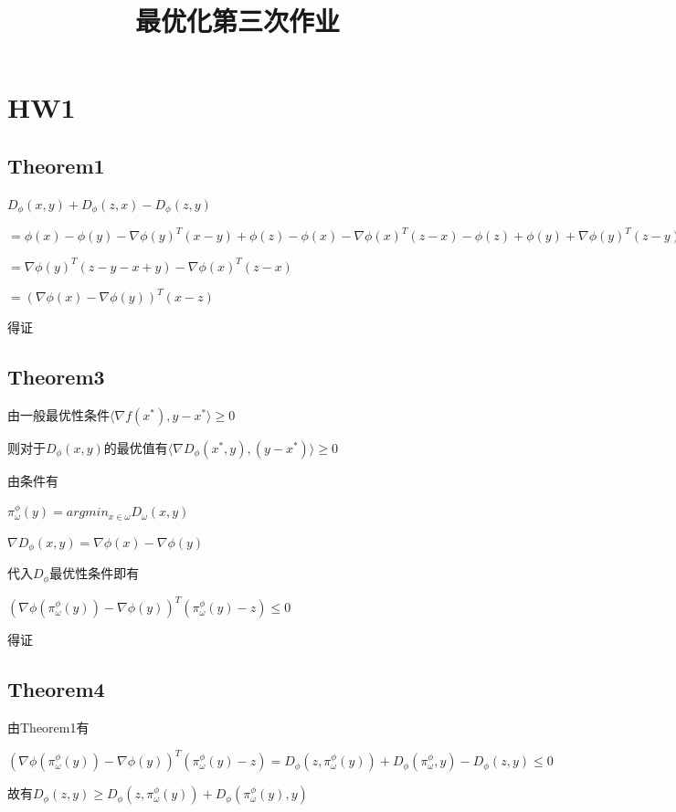 \documentclass{xjtureport}
\title{最优化第三次作业}
\date{\zhtoday}
\begin{document}
\makecover

\makeheader


\section{HW1}
\subsection{Theorem1}
$D_{\phi }(x,y) + D_{\phi}(z,x) - D_{\phi}(z,y)$

$=\phi (x) - \phi (y) - \nabla \phi(y)^{T}(x-y) + \phi(z) - \phi(x) - \nabla\phi(x)^{T}(z-x) - \phi(z) + \phi(y) + \nabla\phi(y)^{T}(z-y)$

$=\nabla\phi(y)^{T}(z-y-x+y) - \nabla\phi(x)^{T}(z-x)$

$=(\nabla\phi(x) - \nabla\phi(y))^{T}(x-z)$

得证
\subsection{Theorem3}
由一般最优性条件$\langle \nabla f(x^{*}), y-x^{*} \rangle \geq 0$

则对于$D_{\phi}(x,y)$的最优值有$\langle \nabla D_{\phi}(x^{*},y) , (y-x^{*})\rangle \geq 0$

由条件有

$\pi ^{\phi}_{\omega}(y) = argmin_{x \in \omega} D_{\omega}(x,y)$

$\nabla D_{\phi}(x,y) = \nabla \phi(x) - \nabla \phi(y)$

代入$D_{\phi}$最优性条件即有

$(\nabla \phi(\pi_{\omega}^{\phi}(y)) - \nabla\phi(y))^{T}(\pi _{\omega}^{\phi}(y) -z) \leq 0 $

得证
\subsection{Theorem4}
由Theorem1有

$(\nabla \phi(\pi_{\omega}^{\phi}(y)) - \nabla\phi(y))^{T}(\pi _{\omega}^{\phi}(y) -z) = D_{\phi}(z,\pi _{\omega}^{\phi}(y))+ D_{\phi}(\pi_{\omega}^{\phi},y) - D_{\phi}(z,y) \leq 0$

故有$D_{\phi}(z,y) \geq D_{\phi}(z,\pi_{\omega}^{\phi}(y)) + D_{\phi}(\pi_{\omega}^{\phi}(y),y)$
\end{document}
